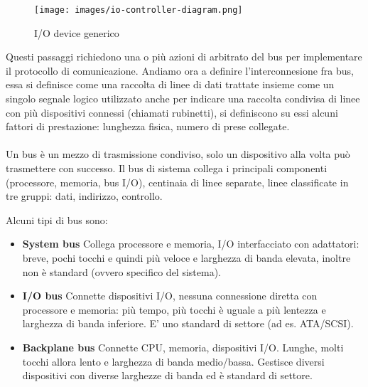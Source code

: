 \begin{wrapfigure}{r}{7cm}
    \vspace{-35pt}
    \centering
    \texttt{[image: images/io-controller-diagram.png]}
    \caption{I/O device generico}
\end{wrapfigure}
Questi passaggi richiedono una o più azioni di arbitrato del bus per implementare il protocollo di comunicazione.
Andiamo ora a definire l'interconnesione fra bus, essa si definisce come una raccolta di linee di dati trattate insieme come un singolo segnale logico
utilizzato anche per indicare una raccolta condivisa di linee con più dispositivi connessi (chiamati rubinetti), si definiscono su essi alcuni fattori di prestazione: lunghezza fisica, numero di prese collegate.
\\\\Un bus è un mezzo di trasmissione condiviso, solo un dispositivo alla volta può trasmettere con successo. Il bus di sistema collega i principali componenti (processore, memoria, bus I/O), centinaia di linee separate, linee classificate in tre gruppi: dati, indirizzo, controllo.
\newpage

\noindent Alcuni tipi di bus sono:
\begin{itemize}
    \item \textbf{System bus} Collega processore e memoria, I/O interfacciato con adattatori: breve, pochi tocchi e quindi più veloce e larghezza di banda elevata, inoltre non è standard (ovvero specifico del sistema).
    \item \textbf{I/O bus} Connette dispositivi I/O, nessuna connessione diretta con processore e memoria: più tempo, più tocchi è uguale a più lentezza e larghezza di banda inferiore. E' uno standard di settore (ad es. ATA/SCSI).
    \item \textbf{Backplane bus} Connette CPU, memoria, dispositivi I/O. Lunghe, molti tocchi allora lento e larghezza di banda medio/bassa. Gestisce diversi dispositivi con diverse larghezze di banda ed è standard di settore.
\end{itemize}

